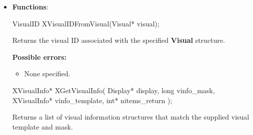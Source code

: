 \documentclass{report}
\begin{document}
\begin{itemize}
\begin{cppcode}
{                    unsigned long backing_pixel;    /* value to use in restoring planes */
                    Bool save_under;                /* should bits under be saved? (popups) */
                    long event_mask;                /* set of events that should be saved */
                    long do_not_propagate_mask;     /* set of events that should not propagate */
                    Bool override_redirect;         /* boolean value for override_redirect */
                    Colormap colormap;              /* color map to be associated with window */
                    Cursor cursor;                  /* cursor to be displayed (or None) */
                } XSetWindowAttributes;
            \end{cppcode}
            \begin{cppcode}
                /* Configure window value mask bits */
                #define CWX                 (1<<0)
                #define CWY                 (1<<1)
                #define CWWidth             (1<<2)
                #define CWHeight            (1<<3)
                #define CWBorderWidth       (1<<4)
                #define CWSibling           (1<<5)
                #define CWStackMode         (1<<6)

                /* Values */

                typedef struct {
                    int x, y;
                    int width, height;
                    int border_width;
                    Window sibling;
                    int stack_mode;
                } XWindowChanges;
            \end{cppcode}

         \item \textbf{Functions}:
            \begin{cppcode}
                VisualID XVisualIDFromVisual(Visual* visual);
            \end{cppcode}
            \bigbreak \noindent
            Returns the visual ID associated with the specified \textbf{Visual} structure.

            \bigbreak \noindent
            \textbf{Possible errors:}
            \begin{itemize}
                \item None specified.
            \end{itemize}

            \begin{cppcode}
                XVisualInfo* XGetVisualInfo(
                    Display* display,
                    long vinfo_mask,
                    XVisualInfo* vinfo_template,
                    int* nitems_return
                );
            \end{cppcode}
            \bigbreak \noindent
            Returns a list of visual information structures that match the supplied visual template and mask.


\end{itemize}
\end{document}
